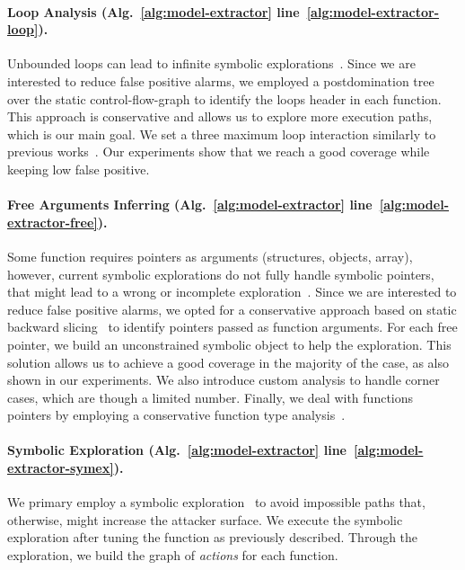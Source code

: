 \paragraph{Loop Analysis (Alg.~\ref{alg:model-extractor} 
	line~\ref{alg:model-extractor-loop}).}

Unbounded loops can lead to infinite symbolic 
explorations~\citep{10.1007/978-3-642-36742-7_47}.
Since we are interested to reduce false positive alarms, we employed a 
postdomination tree~\citep{dominators} over the static control-flow-graph to 
identify the loops header in each function.
This approach is conservative and allows us to explore more execution paths, 
which is our main goal.
We set a three maximum loop interaction similarly to previous 
works~\citep{wang2009intscope}.
Our experiments show that we reach a good coverage while keeping low false 
positive.

\paragraph{Free Arguments Inferring (Alg.~\ref{alg:model-extractor} 
	line~\ref{alg:model-extractor-free}).}
Some function requires pointers as arguments (\eg structures, objects, array), 
however, current symbolic explorations do not fully handle symbolic 
pointers, that might lead to a wrong or incomplete 
exploration~\citep{coppa2017rethinking}.
Since we are interested to reduce false positive alarms, we opted for a 
conservative approach based on static backward slicing~\citep{slicing}
to identify pointers passed as function arguments.
For each free pointer, we build an unconstrained symbolic object to help 
the exploration.
This solution allows us to achieve a good coverage in 
the majority of the case, as also shown in our experiments. We also 
introduce custom analysis to handle corner cases, which are though a 
limited number.
Finally, we deal with functions pointers by employing a conservative function 
type analysis~\citep{abadi2009control}.

\paragraph{Symbolic Exploration (Alg.~\ref{alg:model-extractor} 
	line~\ref{alg:model-extractor-symex}).}
We primary employ a symbolic exploration~\citep{king1976symbolic} to avoid 
impossible paths that, otherwise, might increase the attacker surface.
We execute the symbolic exploration after tuning the function as previously 
described.
Through the exploration, we build the graph of \emph{actions} for each 
function. 

